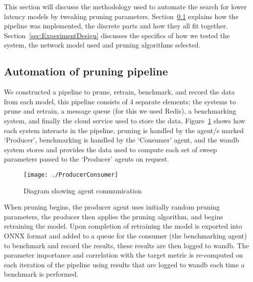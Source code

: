 \documentclass[../Dissertation.tex]{subfiles}
\begin{document}

This section will discusss the methodology used to automate the search for lower latency models by tweaking pruning parameters.
Section~\ref{sec:EngineeringImplementation} explains how the pipeline was implemented, the discrete parts and how they all fit together.
Section~\ref{sec:ExperimentDesign} discusses the specifics of how we tested the system, the network model used and pruning algorithms selected.

\subsection{Automation of pruning pipeline}\label{sec:EngineeringImplementation}

We constructed a pipeline to prune, retrain, benchmark, and record the data from each model, this pipeline consists of 4 separate elements; the systems to prune and retrain, a message queue  (for this we used Redis), a benchmarking system, and finally the cloud service used to store the data.
Figure~\ref{fig:agentCommunication} shows how each system interacts in the pipeline, pruning is handled by the agent/s marked `Producer', benchmarking is handled by the `Consumer' agent, and the \acrfull{wandb} system stores and provides the data used to compute each set of sweep parameters passed to the `Producer' agents on request.

\begin{figure}[H]
    \centering
    \texttt{[image: ./ProducerConsumer]}
    \caption{Diagram showing agent communication}
    \label{fig:agentCommunication}
\end{figure}

When pruning begins, the producer agent uses initially random pruning parameters, the producer then applies the pruning algorithm, and begins retraining the model.
Upon completion of retraining the model is exported into ONNX format and added to a queue for the consumer (the benchmarking agent) to benchmark and record the results, these results are then logged to \acrshort{wandb}.
The parameter importance and correlation with the target metric is re-computed on each iteration of the pipeline using results that are logged to \acrshort{wandb} each time a benchmark is performed.
\end{document}

